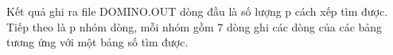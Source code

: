 Kết quả ghi ra file DOMINO.OUT dòng đầu là số lượng p cách xếp tìm được. Tiếp theo là p nhóm dòng, mỗi nhóm gồm 7 dòng ghi các dòng của các bảng tương ứng với một bảng số tìm được.  

\